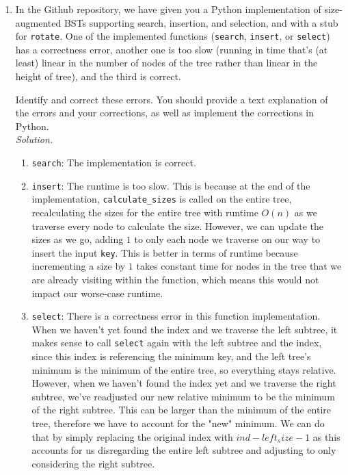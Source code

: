 \documentclass[11pt]{article}
\begin{document}
\begin{enumerate}
    \begin{enumerate}
        \item In the Github repository, we have given you a Python implementation of size-augmented BSTs supporting search, insertion, and selection, and with a stub for \texttt{rotate}. One of the implemented functions (\texttt{search}, \texttt{insert}, or \texttt{select}) has a correctness error, another one is too slow (running in time that's (at least) linear in the number of nodes of the tree rather than linear in the height of tree), and the third is correct.
        
        Identify and correct these errors. You should provide a text explanation of the errors and your corrections, as well as implement the corrections in Python. \\
        
        \textit{Solution.}
            \begin{enumerate}
                \item \texttt{search}: The implementation is correct.
                \item \texttt{insert}: The runtime is too slow. This is because at the end of the implementation, \texttt{calculate\_sizes} is called on the entire tree, recalculating the sizes for the entire tree with runtime $O(n)$ as we traverse every node to calculate the size. However, we can update the sizes as we go, adding $1$ to only each node we traverse on our way to insert the input \texttt{key}. This is better in terms of runtime because incrementing a size by $1$ takes constant time for nodes in the tree that we are already visiting within the function, which means this would not impact our worse-case runtime.
                \item \texttt{select}: There is a correctness error in this function implementation. When we haven't yet found the index and we traverse the left subtree, it makes sense to call \texttt{select} again with the left subtree and the index, since this index is referencing the minimum key, and the left tree's minimum is the minimum of the entire tree, so everything stays relative. However, when we haven't found the index yet and we traverse the right subtree, we've readjusted our new relative minimum to be the minimum of the right subtree. This can be larger than the minimum of the entire tree, therefore we have to account for the "new" minimum. We can do that by simply replacing the original index with \texttt{$ind - left_size - 1$} as this accounts for us disregarding the entire left subtree and adjusting to only considering the right subtree.
    

\end{enumerate}
\end{enumerate}
\end{enumerate}
\end{document}
